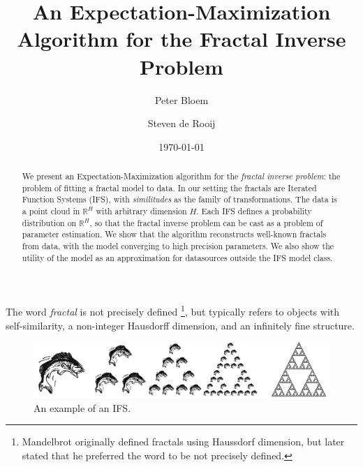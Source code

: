 \documentclass[reprint,amsmath,amssymb,aps,prl]{revtex4-1}
\begin{document}

\title{An Expectation-Maximization Algorithm for the Fractal Inverse Problem}

\author{Peter Bloem}

\author{Steven de Rooij}

\date{\today}

\begin{abstract}
\noindent We present an Expectation-Maximization algorithm for the \emph{fractal inverse problem}: the problem of fitting a fractal model to data. In our setting the fractals are Iterated Function Systems (IFS), with \emph{similitudes} as the family of transformations. The data is a point cloud in ${\mathbb R}^H$ with arbitrary dimension $H$. Each IFS defines a probability distribution on ${\mathbb R}^H$, so that the fractal inverse problem can be cast as a problem of parameter estimation. We show that the algorithm reconstructs well-known fractals from data, with the model converging to high precision parameters. We also show the utility of the model as an approximation for datasources outside the IFS model class. 
\end{abstract}

\maketitle


\noindent The word \emph{fractal} is not precisely defined \footnote{Mandelbrot originally defined fractals using Haussdorf dimension, but later stated that he preferred the word to be not precisely defined.}, but typically refers to objects with self-similarity, a non-integer Hausdorff dimension, and an infinitely fine structure. 


\begin{figure}[b]
  \includegraphics[width=\linewidth]{../img/copies.png}
  \caption{An example of an IFS.}
  \label{figure:example}
\end{figure}
\end{document}
